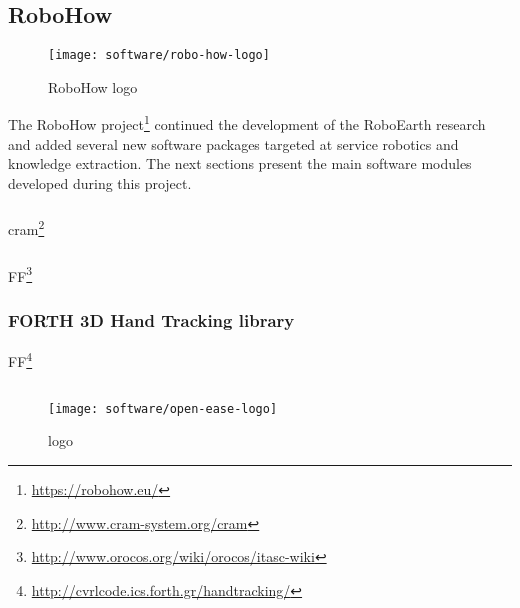 \subsection{RoboHow}

\begin{wrapfigure}{r}{0.23\textwidth}
	\centering
	\vspace*{-2em}
	\texttt{[image: software/robo-how-logo]}
	\caption{RoboHow logo}
	\label{fig:robo-how-logo}
\end{wrapfigure}

The RoboHow project\footnote{\url{https://robohow.eu/}} continued the development of the RoboEarth research and added several new software packages targeted at service robotics and knowledge extraction. The next sections present the main software modules developed during this project.

\subsubsection{}

\gls{cram}\footnote{\url{http://www.cram-system.org/cram}} \cite{Beetz2010}


\subsubsection{}

FF\footnote{\url{http://www.orocos.org/wiki/orocos/itasc-wiki}}


\subsubsection{FORTH 3D Hand Tracking library}

FF\footnote{\url{http://cvrlcode.ics.forth.gr/handtracking/}}




\subsection{}

\begin{wrapfigure}{r}{0.23\textwidth}
	\centering
	\vspace*{-2em}
	\texttt{[image: software/open-ease-logo]}
	\caption{ logo}
	\label{fig:open-ease}
\end{wrapfigure}

